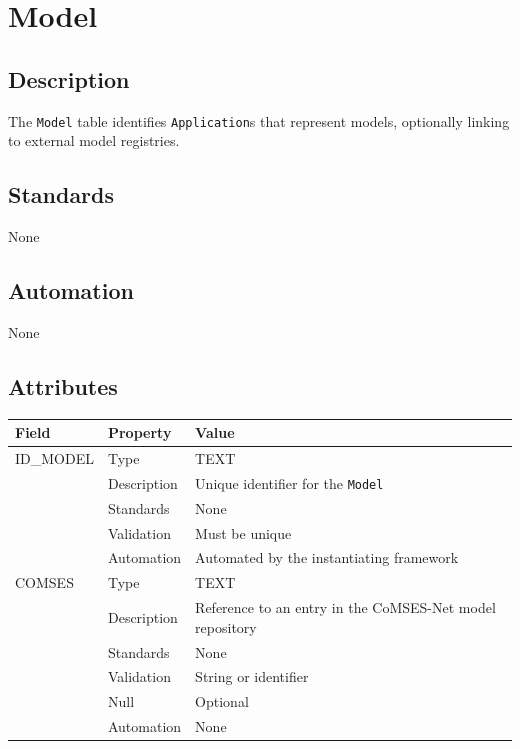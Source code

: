 \documentclass[
]{article}
\newcounter{none}
\begin{document}
\section{Model}\label{model}

\subsection{Description}\label{description-18}

The \texttt{Model} table identifies \texttt{Application}s that represent
models, optionally linking to external model registries.

\subsection{Standards}\label{standards-20}

None

\subsection{Automation}\label{automation-20}

None

\subsection{Attributes}\label{attributes-17}

{\def\LTcaptype{none} 
\begin{longtable}[]{@{}
  >{\raggedright\arraybackslash}p{}
  >{\raggedright\arraybackslash}p{}
  >{\raggedright\arraybackslash}p{}@{}}
\toprule\noalign{}
\begin{minipage}[b]{\linewidth}\raggedright
Field
\end{minipage} & \begin{minipage}[b]{\linewidth}\raggedright
Property
\end{minipage} & \begin{minipage}[b]{\linewidth}\raggedright
Value
\end{minipage} \\
\midrule\noalign{}
\endhead
\bottomrule\noalign{}
\endlastfoot
ID\_MODEL & Type & TEXT \\
& Description & Unique identifier for the \texttt{Model} \\
& Standards & None \\
& Validation & Must be unique \\
& Automation & Automated by the instantiating framework \\
COMSES & Type & TEXT \\
& Description & Reference to an entry in the CoMSES-Net model
repository \\
& Standards & None \\
& Validation & String or identifier \\
& Null & Optional \\
& Automation & None \\
\end{longtable}
}
\end{document}
